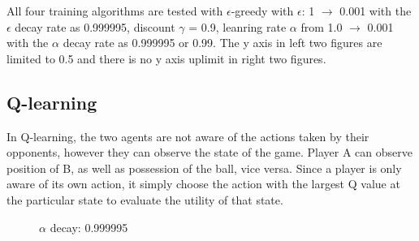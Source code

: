 \documentclass[conference]{IEEEtran}
\begin{document}
All four training algorithms are tested with $\epsilon$-greedy with $\epsilon$: 1 $\to$ 0.001 with the $\epsilon$ decay rate as 0.999995, discount $\gamma$ = 0.9, leanring rate $\alpha$ from 1.0 $\to$ 0.001 with the $\alpha$ decay rate as 0.999995 or 0.99. The y axis in left two figures are limited to 0.5 and there is no y axis uplimit in right two figures. 

\subsection{Q-learning}

In Q-learning, the two agents are not aware of the actions taken by their opponents, however they can observe the state of the game. Player A can observe position of B, as well as possession of the ball, vice versa. Since a player is only aware of its own action, it simply choose the action with the largest Q value at the particular state to evaluate the utility of that state.

\begin{figure}[htbp]
\centering
{}%
%
\centering
\caption{$\alpha$ decay: 0.999995}
\label{fig:QLearning1}
\end{figure}
\end{document}
